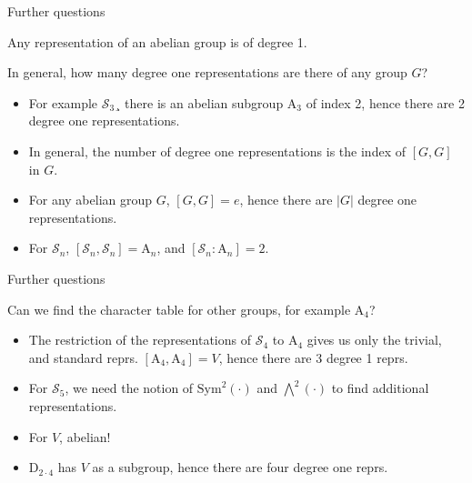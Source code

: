 \documentclass[10pt]{beamer}
\newcommand{\Sym}{\mathcal{S}}
\begin{document}
\begin{frame}{Further questions}
	\begin{corollary}
		Any representation of an abelian group is of degree 1.
	\end{corollary}
	
	\begin{block}{In general, how many degree one representations are there of any group $G$?}
		\begin{itemize}
			\item For example $\Sym_3$¸ there is an abelian subgroup $\text{A}_3$ of index 2, hence there are 2 degree one representations.
			
			
			
			\item In general, the number of degree one representations is the index of $[G,G]$ in $G$.
			
			\item For any abelian group $G$, $[G,G]=e$, hence there are $|G|$ degree one representations.
			
			\item For $\Sym_n$, $[\Sym_n,\Sym_n] = \text{A}_n$, and $[\Sym_n:\text{A}_n] = 2$.
		\end{itemize}
	\end{block}
\end{frame}
\begin{frame}{Further questions}
	\begin{block}{Can we find the character table for other groups, for example $\text{A}_4$?}
		\begin{itemize}
			\item The restriction of the representations of $\Sym_4$ to $\text{A}_4$ gives us only the trivial, and standard reprs. $[\text{A}_4,\text{A}_4] = V$, hence there are 3 degree 1 reprs.
			
			\item For $\Sym_5$, we need the notion of $\text{Sym}^2(\cdot)$ and $\bigwedge^2(\cdot)$ to find additional representations.
			
			\item For $V$, abelian! 
			
			\item $\text{D}_{2 \cdot 4}$ has $V$ as a subgroup, hence there are four degree one reprs.
		\end{itemize}
	\end{block}
	
\end{frame}	
\end{document}
